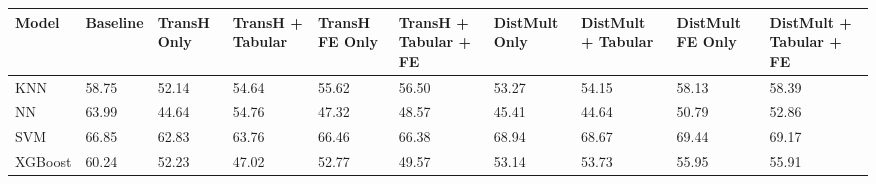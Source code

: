 \begin{tabular}{llllllllll}
\toprule
Model & Baseline & TransH Only & TransH + Tabular & TransH FE Only & TransH + Tabular + FE & DistMult Only & DistMult + Tabular & DistMult FE Only & DistMult + Tabular + FE \\
\midrule
KNN & 58.75 & 52.14 & 54.64 & 55.62 & 56.50 & 53.27 & 54.15 & 58.13 & 58.39 \\
NN & 63.99 & 44.64 & 54.76 & 47.32 & 48.57 & 45.41 & 44.64 & 50.79 & 52.86 \\
SVM & 66.85 & 62.83 & 63.76 & 66.46 & 66.38 & 68.94 & 68.67 & 69.44 & 69.17 \\
XGBoost & 60.24 & 52.23 & 47.02 & 52.77 & 49.57 & 53.14 & 53.73 & 55.95 & 55.91 \\
\bottomrule
\end{tabular}
